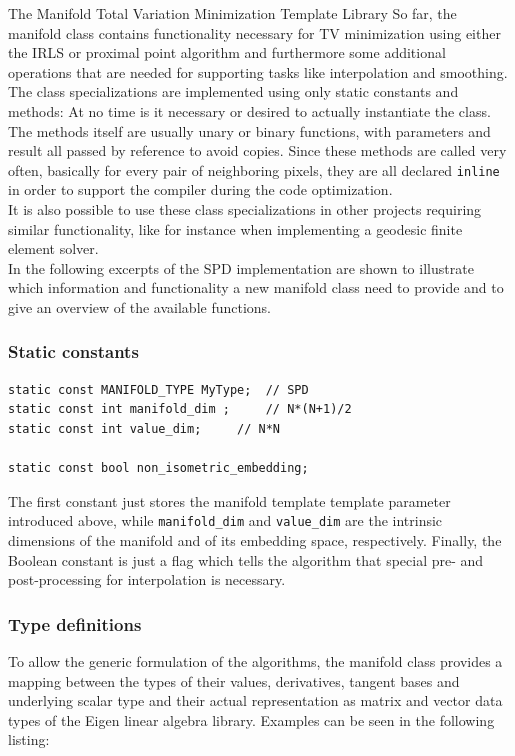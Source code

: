 \begin{chapter}{The Manifold Total Variation Minimization Template Library}
So far, the manifold class contains functionality necessary for TV minimization using either the IRLS or proximal point algorithm and furthermore some additional operations
that are needed for supporting tasks like interpolation and smoothing. The class specializations are implemented using only static constants and methods: At no time is it necessary or 
desired to actually instantiate the class. The methods itself are usually unary or binary functions, with parameters and result all passed by reference to avoid copies.
Since these methods are called very often, basically for every pair of neighboring pixels, they are all declared \texttt{inline} in order to support the compiler during 
the code optimization.\\

It is also possible to use these class specializations in other projects requiring similar functionality, like 
for instance when implementing a geodesic finite element solver.\\

In the following excerpts of the SPD implementation are shown to illustrate which information and functionality a new manifold class need to provide and to give an overview
of the available functions.

\subsubsection{Static constants} %
\label{ssub:Static constants}
\cppinline
\begin{lstlisting}
static const MANIFOLD_TYPE MyType;	// SPD
static const int manifold_dim ;		// N*(N+1)/2
static const int value_dim;		// N*N

static const bool non_isometric_embedding;
\end{lstlisting}
The first constant just stores the manifold template template parameter introduced above, while \texttt{manifold\_dim} and \texttt{value\_dim} are the intrinsic dimensions of the manifold
and of its embedding space, respectively. Finally, the Boolean constant is just a flag which tells the algorithm that special pre- and post-processing for interpolation is necessary.\\

\subsubsection{Type definitions} %
\label{ssub:Type definitions}
To allow the generic formulation of the algorithms, the manifold class provides a mapping between the types of their values, derivatives, tangent bases and underlying scalar type and their 
actual representation as matrix and vector data types of the Eigen linear algebra library. Examples can be seen in the following listing:


\end{chapter}
